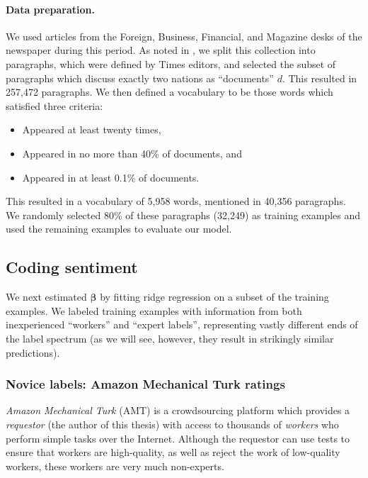 \paragraph{Data preparation.}
We used articles from the Foreign, Business, Financial, and Magazine
desks of the newspaper during this period. As noted in
, we split this collection into paragraphs,
which were defined by Times editors, and selected the subset of paragraphs
which discuss exactly two nations as ``documents'' $d$.  This resulted
in 257,472 paragraphs.  We then defined a vocabulary to be those words
which satisfied three criteria:
\begin{itemize}
  \item Appeared at least twenty times,
  \item Appeared in no more than 40\% of documents, and
  \item Appeared in at least 0.1\% of documents.
\end{itemize}

This resulted in a vocabulary of 5,958 words, mentioned in 40,356
paragraphs. We randomly selected 80\% of these paragraphs (32,249) as
training examples and used the remaining examples to evaluate our
model.

\subsection{Coding sentiment}
\label{section:sentiment_models}

We next estimated $\bm \beta$ by fitting ridge regression on a subset
of the training examples.  We labeled training examples with
information from both inexperienced ``workers'' and ``expert labels'',
representing vastly different ends of the label spectrum (as we will
see, however, they result in strikingly similar predictions).

\subsubsection{Novice labels: Amazon Mechanical Turk ratings}
\label{section:mturk}

\emph{Amazon Mechanical Turk} (AMT) is a crowdsourcing platform which
provides a \emph{requestor} (the author of this thesis) with access to
thousands of \emph{workers} who perform simple tasks over the
Internet.  Although the requestor can use tests to ensure that workers
are high-quality, as well as reject the work of low-quality workers,
these workers are very much non-experts.

